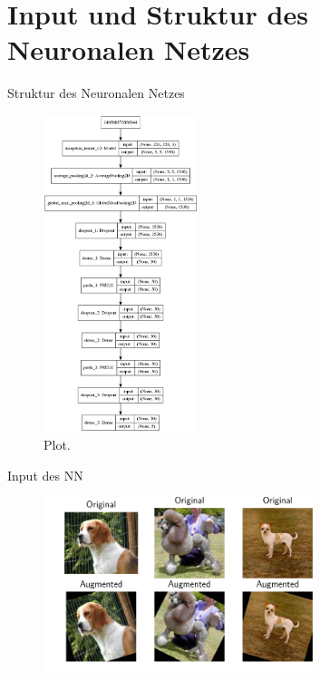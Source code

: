 


\maketitle
  \section{Input und Struktur des Neuronalen Netzes}
  \begin{frame}{Struktur des Neuronalen Netzes}
    \begin{figure}
      \centering
      \includegraphics[width=0.4\textwidth]{logos/model_plot.png}
      \caption{Plot.}
      \label{fig:1}
    \end{figure}
  \end{frame}
  \begin{frame}{Input des NN}
    \begin{figure}
      \centering
      \includegraphics[width=0.7\textwidth]{logos/subplot.pdf}
      \label{fig:input}
    \end{figure}
  \end{frame}


